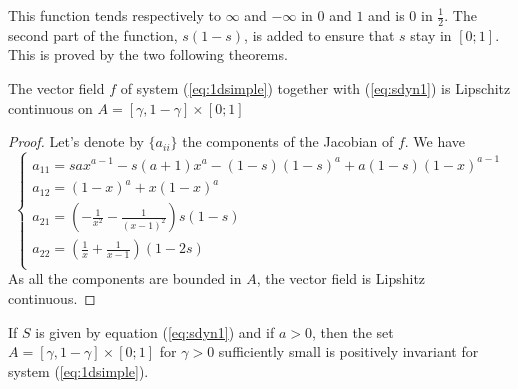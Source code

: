 \documentclass{article}
\begin{document}
This function tends respectively to $\infty$ and $-\infty$ in $0$ and $1$ and is $0$ in $\frac{1}{2}$.
The second part of the function, $s(1-s)$, is added to ensure that $s$ stay in $[0;1]$.
This is proved by the two following theorems. \\

\begin{theorem}{}
The vector field $f$ of system (\ref{eq:1dsimple}) together with (\ref{eq:sdyn1}) is Lipschitz continuous on $A = [\gamma, 1-\gamma] \times [0;1]$
\end{theorem}

\begin{proof}
Let's denote by $\{ a_{ii}\}$ the components of the Jacobian of $f$.
We have
\begin{equation}
\label{eq:jacob}
\begin{cases}
a_{11} = sax^{a-1} - s(a+1)x^a - (1-s)(1-s)^a + a(1-s)(1-x)^{a-1} \\
a_{12} = (1-x)^a + x(1-x)^a \\
a_{21} = (-\frac{1}{x^2}-\frac{1}{(x-1)^2})s(1-s) \\
a_{22} = (\frac{1}{x}+\frac{1}{x-1})(1-2s) \\
\end{cases}
\end{equation}
As all the components are bounded in $A$, the vector field is Lipshitz continuous.
\end{proof}

\begin{theorem}{}
\label{posinv}
If $S$ is given by equation (\ref{eq:sdyn1}) and if $a>0$, then the set $A = [\gamma, 1-\gamma] \times [0;1]$ for $\gamma > 0$ sufficiently small is positively invariant for system (\ref{eq:1dsimple}).
\end{theorem}
\end{document}
